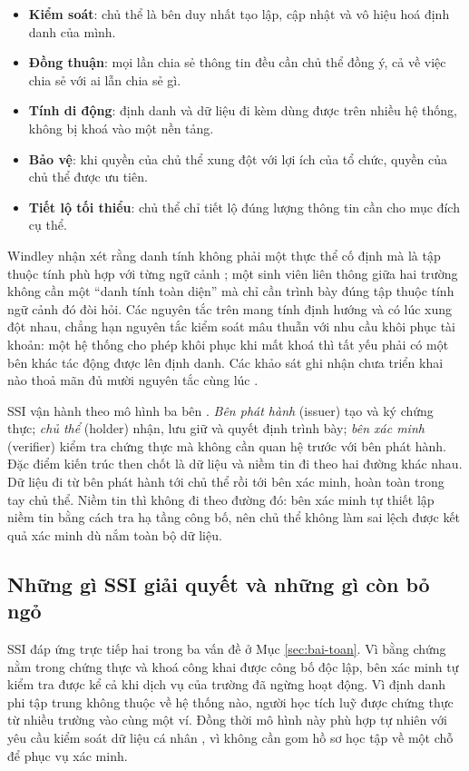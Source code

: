 \begin{itemize}
    \item \textbf{Kiểm soát}: chủ thể là bên duy nhất tạo lập, cập nhật và vô hiệu hoá định danh của mình.
    \item \textbf{Đồng thuận}: mọi lần chia sẻ thông tin đều cần chủ thể đồng ý, cả về việc chia sẻ với ai lẫn chia sẻ gì.
    \item \textbf{Tính di động}: định danh và dữ liệu đi kèm dùng được trên nhiều hệ thống, không bị khoá vào một nền tảng.
    \item \textbf{Bảo vệ}: khi quyền của chủ thể xung đột với lợi ích của tổ chức, quyền của chủ thể được ưu tiên.
    \item \textbf{Tiết lộ tối thiểu}: chủ thể chỉ tiết lộ đúng lượng thông tin cần cho mục đích cụ thể.
\end{itemize}

Windley nhận xét rằng danh tính không phải một thực thể cố định mà là tập thuộc tính phù hợp với từng ngữ cảnh \cite{Windley2023}; một sinh viên liên thông giữa hai trường không cần một ``danh tính toàn diện'' mà chỉ cần trình bày đúng tập thuộc tính ngữ cảnh đó đòi hỏi. Các nguyên tắc trên mang tính định hướng và có lúc xung đột nhau, chẳng hạn nguyên tắc kiểm soát mâu thuẫn với nhu cầu khôi phục tài khoản: một hệ thống cho phép khôi phục khi mất khoá thì tất yếu phải có một bên khác tác động được lên định danh. Các khảo sát ghi nhận chưa triển khai nào thoả mãn đủ mười nguyên tắc cùng lúc \cite{Schardong2022, Muhle2018}.

SSI vận hành theo mô hình ba bên \cite{Preukschat2021}. \emph{Bên phát hành} (issuer) tạo và ký chứng thực; \emph{chủ thể} (holder) nhận, lưu giữ và quyết định trình bày; \emph{bên xác minh} (verifier) kiểm tra chứng thực mà không cần quan hệ trước với bên phát hành. Đặc điểm kiến trúc then chốt là dữ liệu và niềm tin đi theo hai đường khác nhau. Dữ liệu đi từ bên phát hành tới chủ thể rồi tới bên xác minh, hoàn toàn trong tay chủ thể. Niềm tin thì không đi theo đường đó: bên xác minh tự thiết lập niềm tin bằng cách tra hạ tầng công bố, nên chủ thể không làm sai lệch được kết quả xác minh dù nắm toàn bộ dữ liệu.

\subsection{Những gì SSI giải quyết và những gì còn bỏ ngỏ}

SSI đáp ứng trực tiếp hai trong ba vấn đề ở Mục \ref{sec:bai-toan}. Vì bằng chứng nằm trong chứng thực và khoá công khai được công bố độc lập, bên xác minh tự kiểm tra được kể cả khi dịch vụ của trường đã ngừng hoạt động. Vì định danh phi tập trung không thuộc về hệ thống nào, người học tích luỹ được chứng thực từ nhiều trường vào cùng một ví. Đồng thời mô hình này phù hợp tự nhiên với yêu cầu kiểm soát dữ liệu cá nhân \cite{LuatBVDLCN2025}, vì không cần gom hồ sơ học tập về một chỗ để phục vụ xác minh.

